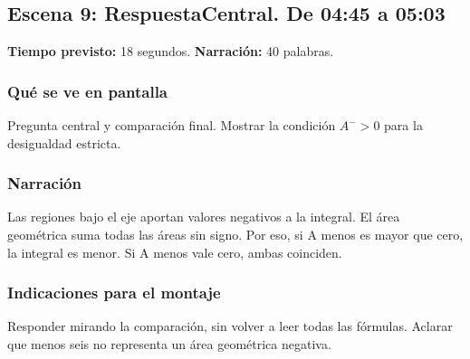 \documentclass[11pt,a4paper]{article}
\newcommand{\escena}[4]{\textbf{Escena #1: #2.} De #3 a #4}
\begin{document}
\noindent\begin{minipage}[t]{\textwidth}
\subsection*{\escena{9}{RespuestaCentral}{04:45}{05:03}}

\textbf{Tiempo previsto:} 18 segundos. \textbf{Narración:} 40 palabras.

\subsubsection*{Qué se ve en pantalla}
Pregunta central y comparación final. Mostrar la condición $A^->0$ para la desigualdad estricta.

\subsubsection*{Narración}
Las regiones bajo el eje aportan valores negativos a la integral. El área geométrica suma todas las áreas sin signo. Por eso, si A menos es mayor que cero, la integral es menor. Si A menos vale cero, ambas coinciden.

\subsubsection*{Indicaciones para el montaje}
Responder mirando la comparación, sin volver a leer todas las fórmulas. Aclarar que menos seis no representa un área geométrica negativa.
\end{minipage}\par\medskip
\end{document}
